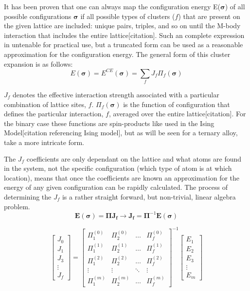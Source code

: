 \documentclass{article}
\begin{document}
It has been proven that one can always map the configuration energy E($\bm{\sigma}$) of all possible configurations $\bm{\sigma}$ if all possible types of clusters ($f$) that are present on the given lattice are included: unique pairs, triples, and so on until the M-body interaction that includes the entire lattice[citation]. Such an complete expression in untenable for practical use, but a truncated form can be used as a reasonable approximation for the configuration energy. The general form of this cluster expansion is as follows:
$$ E(\bm{\sigma}) = E^{CE}(\bm{\sigma}) = \sum_{f} J_f \Pi_f(\bm{\sigma}) $$

\noindent $J_f$ denotes the effective interaction strength associated with a particular combination of lattice sites, $f$. $\Pi_f(\bm{\sigma})$ is the function of configuration that defines the particular interaction, $f$, averaged over the entire lattice[citation]. For the binary case these functions are spin-products like used in the Ising Model[citation referencing Ising model], but as will be seen for a ternary alloy, take a more intricate form.

The $J_f$ coefficients are only dependant on the lattice and what atoms are found in the system, not the specific configuration (which type of atom is at which location), means that once the coefficients are known an approximation for the energy of any given configuration can be rapidly calculated. The process of determining the $J_f$ is a rather straight forward, but non-trivial, linear algebra problem.
$$ \bm{E(\bm{\sigma})} = \bm{\Pi}\bm{J_f} \rightarrow \bm{J_f} = \bm{\Pi}^{-1} \bm{E(\bm{\sigma})}$$

\begin{equation}
\label{eqn:CElin}
\begin{bmatrix}
    J_0\\
    J_1\\
    J_3\\
    \vdots\\
    J_f
\end{bmatrix}
=
\begin{bmatrix}
    \Pi_1^{(0)} & \Pi_2^{(0)} & \hdots & \Pi_f^{(0)}\\
    \Pi_1^{(1)} & \Pi_2^{(1)} & \hdots & \Pi_f^{(1)}\\
    \Pi_1^{(2)} & \Pi_2^{(2)} & \hdots & \Pi_f^{(2)}\\
    \vdots & \vdots & \ddots & \vdots\\
    \Pi_1^{(m)} & \Pi_2^{(m)} & \hdots & \Pi_f^{(m)}
\end{bmatrix}^{-1}
\begin{bmatrix}
    E_1\\
    E_2\\
    E_3\\
    \vdots\\
    E_m
\end{bmatrix}
\end{equation}
\end{document}
